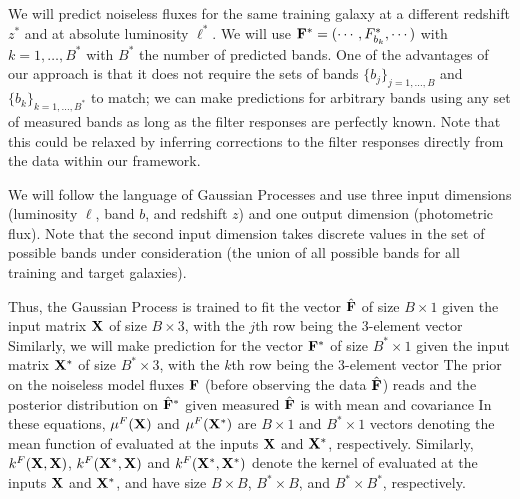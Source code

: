 \documentclass[aps,prd,showpacs,superscriptaddress,groupedaddress]{revtex4}  %
\begin{document}
We will predict noiseless fluxes for the same training galaxy at a different redshift $z^*$ and at absolute luminosity $\ell^*$. 
We will use ${\mat{F}}^* = (\cdots, {F}^*_{b_k}, \cdots)$ with $k=1, \dots, B^*$ with $B^*$ the number of predicted bands. 
One of the advantages of our approach is that it does not require the sets of bands $\{ b_j \}_{j=1, \dots, B}$ and $\{ b_k \}_{k=1, \dots, B^*}$ to match; we can make predictions for arbitrary bands using any set of measured bands as long as the filter responses are perfectly known. Note that this could be relaxed by inferring corrections to the filter responses directly from the data within our framework.

We will follow the language of Gaussian Processes and use three input dimensions (luminosity $\ell$, band $b$, and redshift $z$) and one output dimension (photometric flux). Note that the second input dimension takes discrete values in the set of possible bands under consideration (the union of all possible bands for all training and target galaxies).

Thus, the Gaussian Process is trained to fit the vector $\hat{\mat{F}}$ of size $B \times 1$ given the input matrix $\mat{X}$ of size $B \times 3$, with the $j$th row being the 3-element vector
Similarly, we will make prediction for the vector ${\mat{F}}^*$ of size $B^*\times 1$ given the input matrix $\mat{X^*}$ of size $B^* \times 3$, with the $k$th row being the 3-element vector
The prior on the noiseless model fluxes $\mat{F}$ (before observing the data $\hat{\mat{F}}$) reads
and the posterior distribution on $\hat{\mat{F}}^*$ given measured $\hat{\mat{F}}$  is
with mean and covariance
In these equations, $\mu^F(\mat{X})$ and $\mu^F(\mat{X}^*)$ are $B \times 1$ and  $B^* \times 1$ vectors denoting the mean function of  evaluated at the inputs $\mat{X}$ and $\mat{X}^*$, respectively. 
Similarly, $k^F(\mat{X}, \mat{X})$, $k^F(\mat{X}^*, \mat{X})$ and $k^F(\mat{X}^*, \mat{X}^*)$ denote the kernel of  evaluated at the inputs $\mat{X}$ and $\mat{X}^*$, and have size $B \times B$, $B^* \times B$, and $B^* \times B^*$, respectively.
\end{document}
